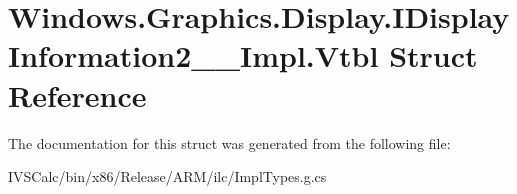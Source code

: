 \hypertarget{struct_windows_1_1_graphics_1_1_display_1_1_i_display_information2_____impl_1_1_vtbl}{}\section{Windows.\+Graphics.\+Display.\+I\+Display\+Information2\+\_\+\+\_\+\+Impl.\+Vtbl Struct Reference}
\label{struct_windows_1_1_graphics_1_1_display_1_1_i_display_information2_____impl_1_1_vtbl}


The documentation for this struct was generated from the following file\+:\begin{DoxyCompactItemize}
\item 
I\+V\+S\+Calc/bin/x86/\+Release/\+A\+R\+M/ilc/Impl\+Types.\+g.\+cs\end{DoxyCompactItemize}
